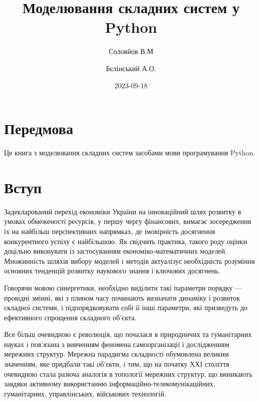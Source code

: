 \documentclass[
  letterpaper,
]{report}
\title{Моделювання складних систем у Python}
\author{Соловйов В.М \and Бєлінський А.О.}
\date{2023-09-18}
\renewcommand*\contentsname{Зміст}
\newcommand\contentsname{Зміст}
\begin{document}
\maketitle
\ifdefined\Shaded\renewenvironment{Shaded}{\begin{tcolorbox}[enhanced, borderline west={3pt}{0pt}{shadecolor}, sharp corners, interior hidden, breakable, frame hidden, boxrule=0pt]}{\end{tcolorbox}}\fi

\renewcommand*\contentsname{Зміст}
{
\hypersetup{linkcolor=}
\setcounter{tocdepth}{2}
\tableofcontents
}

\hypertarget{ux43fux435ux440ux435ux434ux43cux43eux432ux430}{%
\chapter*{Передмова}\label{ux43fux435ux440ux435ux434ux43cux43eux432ux430}}


Це книга з моделювання складних систем засобами мови програмування
Python.


\hypertarget{ux432ux441ux442ux443ux43f}{%
\chapter{Вступ}\label{ux432ux441ux442ux443ux43f}}

Задекларований перехід економіки України на інноваційний шлях розвитку в
умовах обмеженості ресурсів, у першу чергу фінансових, вимагає
зосередження їх на найбільш перспективних напрямках, де імовірність
досягнення конкурентного успіху є найбільшою. Як свідчить практика,
такого роду оцінки доцільно виконувати із застосуванням
економіко-математичних моделей. Множинність шляхів вибору моделей і
методів актуалізує необхідність розуміння основних тенденцій розвитку
наукового знання і ключових досягнень.

Говорячи мовою синергетики, необхідно виділити такі параметри порядку
--- провідні змінні, які з плином часу починають визначати динаміку і
розвиток складної системи, і підпорядковувати собі її інші параметри,
які призведуть до ефективного спрощення складного об'єкта.

Все більш очевидною є революція, що почалася в природничих та
гуманітарних науках і пов'язана з вивченням феномена самоорганізації і
дослідженням мережних структур. Мережна парадигма складності обумовлена
великим значенням, яке придбали такі об'єкти, і тим, що на початку ХХІ
століття очевидною стала разюча аналогія в топології мережних структур,
що виникають завдяки активному використанню
інформаційно-телекомунікаційних, гуманітарних, управлінських, військових
технологій.
\end{document}
